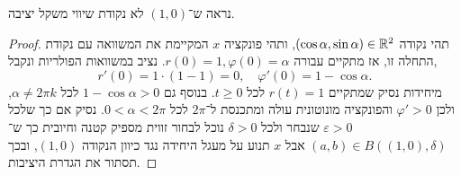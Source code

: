 \subquestion{}
נראה ש־$(1, 0)$ לא נקודת שיווי משקל יציבה.
\begin{proof}
	תהי נקודה $(\cos \alpha, \sin \alpha) \in \mathbb{R}^2$, ותהי פונקציה $x$ המקיימת את המשוואה עם נקודת התחלה זו, אז מתקיים עבורה $r(0) = 1, \varphi(0) = \alpha$.
	נציב במשוואות הפולריות ונקבל,
	\[
		r'(0)
		= 1 \cdot (1 - 1)
		= 0,
		\quad
		\varphi'(0)
		= 1 - \cos \alpha
	.\]
	מיחידות נסיק שמתקיים $r(t) = 1$ לכל $t \ge 0$.
	בנוסף גם $1 - \cos \alpha > 0$ לכל $\alpha \ne 2 \pi k$, ולכן $\varphi' > 0$ והפונקציה מונוטונית עולה ומתכנסת ל־$2 \pi$ לכל $0 < \alpha < 2 \pi$.
	נסיק אם כך שלכל $\varepsilon > 0$ שנבחר ולכל $\delta > 0$ נוכל לבחור זווית מספיק קטנה וחיובית כך ש־$(a, b) \in B((1, 0), \delta)$ אבל $x$ תנוע על מעגל היחידה נגד כיוון הנקודה $(1, 0)$, ובכך תסתור את הגדרת היציבות.
\end{proof}


